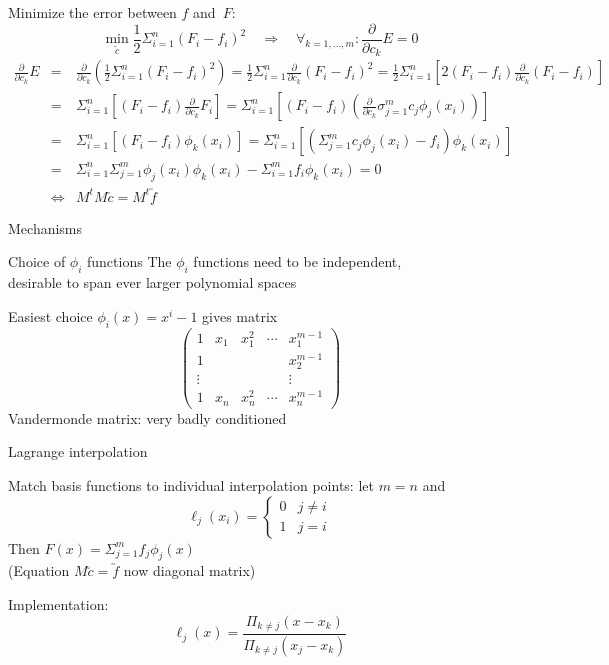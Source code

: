   Minimize the error between $f$ and~$F$:
  \[ \min_{\utilde c} \frac12 \Sigma_{i=1}^n (F_i-f_i)^2 \quad\Rightarrow\quad
  \forall_{k=1,\ldots,m}\colon \frac\partial{\partial c_k}E=0
  \]
  \def\pck{\frac\partial{\partial c_k}}
  \begin{eqnarray*}
    \pck E&=&\pck \left(\frac12\Sigma_{i=1}^n(F_i-f_i)^2\right)
    = \frac12 \Sigma_{i=1}^n \pck (F_i-f_i)^2
    = \frac12 \Sigma_{i=1}^n \left[2(F_i-f_i)\pck (F_i-f_i)\right ]\\
    &=&\Sigma_{i=1}^n\left[(F_i-f_i)\pck F_i\right]
    = \Sigma_{i=1}^n\left[ (F_i-f_i)\left(
        \pck \sigma_{j=1}^m c_j\phi_j(x_i) \right) \right ]\\
    &=& \Sigma_{i=1}^n[(F_i-f_i)\phi_k(x_i)]
    = \Sigma_{i=1}^n\left[ \left( \Sigma_{j=1}^m c_j\phi_j(x_i)-f_i \right)
      \phi_k(x_i) \right]\\
    &=& \Sigma_{i=1}^n\Sigma_{j=1}^m \phi_j(x_i)\phi_k(x_i)
    - \Sigma_{i=1}^m f_i\phi_k(x_i) = 0\\
    &\Leftrightarrow&M^tM\utilde c=M^t\utilde f
  \end{eqnarray*}

 {Mechanisms}

 {Choice of $\phi_i$ functions}
  The $\phi_i$ functions need to be independent,\\
  desirable to span ever larger polynomial spaces

  Easiest choice $\phi_i(x)=x^i-1$ gives matrix
  \[
  \left(\begin{matrix}
    1&x_1&x_1^2&\cdots&x_1^{m-1}\\ 1&&&&x_2^{m-1}\\ \vdots&&&&\vdots\\
    1&x_n&x_n^2&\cdots&x_n^{m-1}
  \end{matrix}\right)
  \]
  Vandermonde matrix: very badly conditioned

 {Lagrange interpolation}
  
  Match basis functions to individual interpolation points: let $m=n$ and
  \[ \ell_j(x_i)=
    \begin{cases}
      0&j\not=i\\ 1&j=i
    \end{cases}
  \]
  Then $F(x)=\Sigma_{j=1}^m f_j\phi_j(x)$\\
  (Equation $M\utilde c=\utilde f$ now diagonal matrix)

  Implementation:
  \[ \ell_j(x)=\frac{\Pi_{k\not=j}(x-x_k)}{\Pi_{k\not=j}(x_j-x_k)} \]


